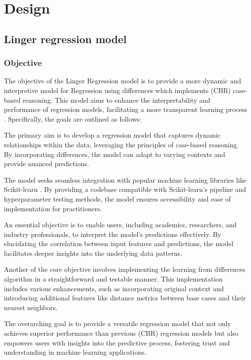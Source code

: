 \documentclass[a4paper, 12pt]{report}
\begin{document}
\chapter{Design}
\label{ch:Design}
\section{Linger regression model}
\subsection{Objective}
The objective of the Linger Regression model is to provide a more dynamic and interpretive model for Regression using differences which implements (CBR) case-based reasoning. 
This model aims to enhance the interpretability and performance of regression models, facilitating a more transparent learning process \cite{learningFromDifferences2022}. 
Specifically, the goals are outlined as follows:

The primary aim is to develop a regression model that captures dynamic relationships within the data, leveraging the principles of case-based reasoning. 
By incorporating differences, the model can adapt to varying contexts and provide nuanced predictions.

The model seeks seamless integration with popular machine learning libraries like Scikit-learn \cite{kramer2016scikit}. 
By providing a codebase compatible with Scikit-learn's pipeline and hyperparameter testing methods, the model ensures accessibility and ease of implementation for practitioners.

An essential objective is to enable users, including academics, researchers, and industry professionals, to interpret the model's predictions effectively. 
By elucidating the correlation between input features and predictions, the model facilitates deeper insights into the underlying data patterns.

Another of the core objective involves implementing the learning from differences algorithm \cite{learningFromDifferences2022} in a straightforward and testable manner. 
This implementation includes various enhancements, such as incorporating original context and introducing additional features like distance metrics between base cases and their nearest neighbors.

The overarching goal is to provide a versatile regression model that not only achieves superior performance than previous (CBR) regression models 
but also empowers users with insights into the predictive process, 
fostering trust and understanding in machine learning applications.
\end{document}
